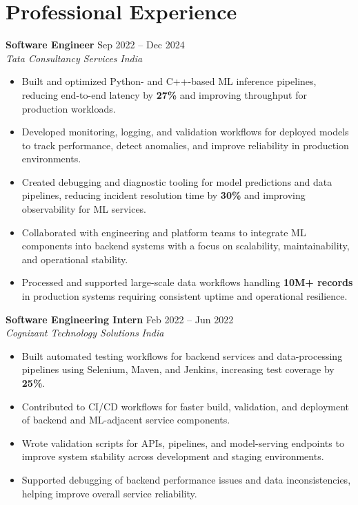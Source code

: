 \documentclass[letterpaper,10pt]{article}
\begin{document}
\section{Professional Experience}

\textbf{Software Engineer} \hfill Sep 2022 -- Dec 2024 \\
\textit{Tata Consultancy Services} \hfill \textit{India}
\begin{itemize}
    \item Built and optimized Python- and C++-based ML inference pipelines, reducing end-to-end latency by \textbf{27\%} and improving throughput for production workloads.
    \item Developed monitoring, logging, and validation workflows for deployed models to track performance, detect anomalies, and improve reliability in production environments.
    \item Created debugging and diagnostic tooling for model predictions and data pipelines, reducing incident resolution time by \textbf{30\%} and improving observability for ML services.
    \item Collaborated with engineering and platform teams to integrate ML components into backend systems with a focus on scalability, maintainability, and operational stability.

    \item Processed and supported large-scale data workflows handling \textbf{10M+ records} in production systems requiring consistent uptime and operational resilience.
\end{itemize}

\vspace{4pt}
\textbf{Software Engineering Intern} \hfill Feb 2022 -- Jun 2022 \\
\textit{Cognizant Technology Solutions} \hfill \textit{India}
\begin{itemize}
    \item Built automated testing workflows for backend services and data-processing pipelines using Selenium, Maven, and Jenkins, increasing test coverage by \textbf{25\%}.
    \item Contributed to CI/CD workflows for faster build, validation, and deployment of backend and ML-adjacent service components.
    \item Wrote validation scripts for APIs, pipelines, and model-serving endpoints to improve system stability across development and staging environments.
    \item Supported debugging of backend performance issues and data inconsistencies, helping improve overall service reliability.
\end{itemize}
\end{document}
